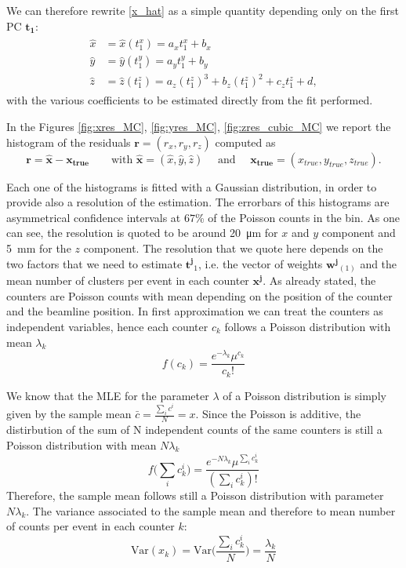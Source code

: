 We can therefore rewrite \eqref{x_hat} as a simple quantity depending only on the first PC $\mathbf{t_1}$:
\begin{align}
\begin{split}
    \hat{x} &= \hat{x}(t^x_1) = a_x t^x_1 + b_x \\
    \hat{y} &= \hat{y}(t^y_1) = a_y t^y_1 + b_y \\\label{x_hat_true}
    \hat{z} &= \hat{z}(t^z_1) = a_z (t^z_1)^3 + b_z (t^z_1)^2 + c_z  t^z_1 + d,
    \end{split}
\end{align} 
with the various coefficients to be estimated directly from the fit performed. 

In the Figures \ref{fig:xres_MC}, \ref{fig:yres_MC}, \ref{fig:zres_cubic_MC} we report the histogram of the residuals $\mathbf{r}=(r_x, r_y, r_z)$ computed as 
 \begin{equation}
     \mathbf{r}=\hat{\mathbf{x}} - \mathbf{x_{true}} \qquad \text{with } \hat{\mathbf{x}} = (\hat{x}, \hat{y}, \hat{z}) \quad \text{ and } \quad \mathbf{x_{true}}=(x_{true}, y_{true}, z_{true}).
 \end{equation}

 Each one of the histograms is fitted with a Gaussian distribution, in order to provide also a resolution of the estimation. The errorbars of this histograms are asymmetrical confidence intervals at $67$\% of the Poisson counts in the bin.
 As one can see, the resolution is quoted to be around \SI{20}{\micro\meter} for $x$ and $y$ component and \SI{5}{\milli\meter} for the $z$ component. The resolution that we quote here depends on the two factors that we need to estimate $\mathbf{t^{j}}_{1}$, i.e. the vector of weights $\mathbf{w^j}_{(1)}$ and the mean number of clusters per event in each counter $\mathbf{x^{j}}$. As already stated, the counters are Poisson counts with mean depending on the position of the counter and the beamline position. In first approximation we can treat the counters as independent variables, hence each counter $c_k$ follows a Poisson distribution with mean $\lambda_k$
 \begin{equation}
     f(c_k) = \frac{e^{-\lambda_k} \mu^{c_k}}{c_k!}
 \end{equation}

 We know that the MLE for the parameter $\lambda$ of a Poisson distribution is simply given by the sample mean $\bar{c}=\frac{\sum_i c^i}{N}=x$. 
 Since the Poisson is additive, the distirbution of the sum of N independent counts of the same counters is still a Poisson distribution with mean $N\lambda_k$
 \begin{equation}
     f\bigl(\sum_i c^i_k\bigr) = \frac{e^{-N\lambda_k} \mu^{\sum_i c^i_k}}{(\sum_i c^i_k)!}
 \end{equation}
Therefore, the sample mean follows still a Poisson distribution with parameter $N\lambda_k$. The variance associated to the sample mean and therefore to mean number of counts per event in each counter $k$:
\begin{equation}
    \text{Var}(x_k) =\text{Var}\biggl(\frac{\sum_i c^i_k}{N}\biggr) = \frac{\lambda_k}{N}
\end{equation}

